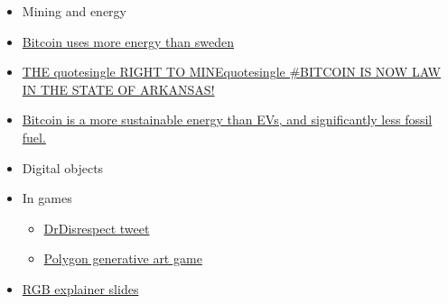 \begin{itemize}
\begin{itemize}
{    critical white house report}
  \item
    \href{https://www.nobsbitcoin.com/fedimint-hackathon-winners-announced/}{Fedimint
    Hackathon Winners Announced: 2.58 BTC in Prizes: "The quality of the
    modules that were submitted was truly impressive, with projects from
    federated storage to community finance tools that really highlighted
    the potential impact of Fedimint as a platform that could solve
    real-world problems."}
  \item
    https://geometry.xyz/notebook/A-light-introduction-to-ZeroSync
  \item
    \href{https://www.technologyreview.com/2022/04/06/1048981/worldcoin-cryptocurrency-biometrics-web3/}{Deception,
    exploited workers, and cash handouts: How Worldcoin recruited its
    first half a million test users: The startup promises a
    fairly-distributed, cryptocurrency-based universal basic income. So
    far all itquotesingle s done is build a biometric database from
    the bodies of the poor.}
  \item
    \href{https://github.com/ngutech21/cashu-rs}{Cashu rust
    implementation}
  \item
    \href{https://zerosync.org/}{Zerosync bitcoin rollup proofs}
  \end{itemize}
\item
  Mining and energy
\item
  \href{https://www.reddit.com/r/CryptoCurrency/comments/12xu714/bitcoin_has_just_surpassed_sweden_for_overall/}{Bitcoin
  uses more energy than sweden}
\item
  \href{https://twitter.com/satoshiactfund/status/1648445448833875969}{THE
  quotesingle RIGHT TO MINEquotesingle{} \#BITCOIN  IS NOW
  LAW IN THE STATE OF ARKANSAS!}
\item
  \href{https://www.linkedin.com/posts/danielsbatten_like-evs-bitcoin-is-a-fully-electrified-activity-7049321186605858816-t4MB?utm_source=share\&utm_medium=member_android}{Bitcoin
  is a more sustainable energy than EVs, and significantly less fossil
  fuel.}
\item
  Digital objects
\item
  In games

  \begin{itemize}
   
  \item
    \href{https://twitter.com/DrDisrespect/status/1632430208379928576}{DrDisrespect
    tweet}
  \item
    \href{https://github.com/beamable/genamon-polygon/}{Polygon
    generative art game}
  \end{itemize}
\item
  \href{https://docsend.com/view/he8x9erkjmphphvn}{RGB explainer slides}


\end{itemize}
